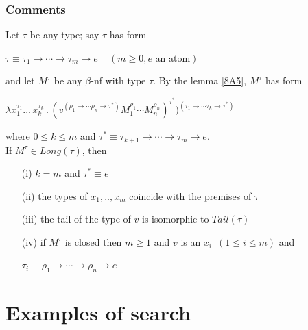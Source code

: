 \begin{frame}
\frametitle{Comments}
Let $\tau$ be any type; say $\tau$ has form
\begin{center}
 $\tau \equiv \tau_1 \rightarrow \cdots \rightarrow \tau_m \rightarrow e \,\,\,\,\,\,\, (m \geq 0, e \mbox{ an atom})$
\end{center}
and let $M^{\tau}$ be any $\beta$-nf with type $\tau$. By the lemma \ref{8A5}, $M^{\tau}$ has form
\begin{center}
 $\lambda x_1^{\tau_1} ... \,x_k^{\tau_k} \, . \,
   (v^{(\rho_1 \rightarrow \cdots \rho_n \rightarrow \tau^*)} M^{\rho_1}_1 \cdots
   M^{\rho_n}_n)^{\tau^*})^{(\tau_1 \rightarrow \cdots \tau_k \rightarrow \tau^*)}$
\end{center}
where $0 \leq k \leq m$ and $\tau^* \equiv \tau_{k+1} \to \cdots \to \tau_m \to e$.\\[0.3 cm]
If $M^{\tau} \in Long(\tau)$, then
\begin{itemize}
 \item[(i)] $k = m$ and $\tau^* \equiv e$
 \item[(ii)] the types of $x_1,..,x_m$ coincide with the premises of $\tau$
 \item[(iii)] the tail of the type of $v$ is isomorphic to $Tail(\tau)$
 \item[(iv)] if $M^{\tau}$ is closed then $m \geq 1$ and $v$ is an $x_i \,\,\, (1 \leq i \leq m)$ and
 \begin{center}
  $\tau_i \equiv \rho_1 \to \cdots \to \rho_n \to e$
 \end{center}

\end{itemize}

\end{frame}

\section{Examples of search} 

